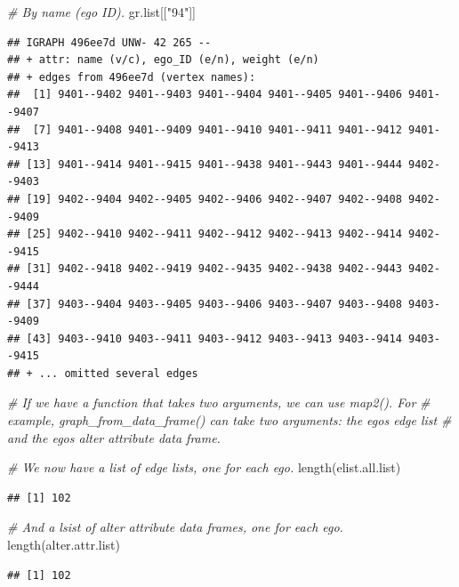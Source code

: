 \documentclass[
]{book}
\newenvironment{Shaded}{\begin{snugshade}}{\end{snugshade}}
\newcommand{\CommentTok}[1]{\textcolor[rgb]{0.56,0.35,0.01}{\textit{#1}}}
\newcommand{\FunctionTok}[1]{\textcolor[rgb]{0.00,0.00,0.00}{#1}}
\newcommand{\NormalTok}[1]{#1}
\newcommand{\StringTok}[1]{\textcolor[rgb]{0.31,0.60,0.02}{#1}}
\begin{document}
\begin{Shaded}
\begin{Highlighting}[]
\CommentTok{\# By name (ego ID).}
\NormalTok{gr.list[[}\StringTok{"94"}\NormalTok{]]}
\end{Highlighting}
\end{Shaded}

\begin{verbatim}
## IGRAPH 496ee7d UNW- 42 265 -- 
## + attr: name (v/c), ego_ID (e/n), weight (e/n)
## + edges from 496ee7d (vertex names):
##  [1] 9401--9402 9401--9403 9401--9404 9401--9405 9401--9406 9401--9407
##  [7] 9401--9408 9401--9409 9401--9410 9401--9411 9401--9412 9401--9413
## [13] 9401--9414 9401--9415 9401--9438 9401--9443 9401--9444 9402--9403
## [19] 9402--9404 9402--9405 9402--9406 9402--9407 9402--9408 9402--9409
## [25] 9402--9410 9402--9411 9402--9412 9402--9413 9402--9414 9402--9415
## [31] 9402--9418 9402--9419 9402--9435 9402--9438 9402--9443 9402--9444
## [37] 9403--9404 9403--9405 9403--9406 9403--9407 9403--9408 9403--9409
## [43] 9403--9410 9403--9411 9403--9412 9403--9413 9403--9414 9403--9415
## + ... omitted several edges
\end{verbatim}

\begin{Shaded}
\begin{Highlighting}[]
\CommentTok{\# If we have a function that takes two arguments, we can use map2(). For}
\CommentTok{\# example, graph\_from\_data\_frame() can take two arguments: the ego\textquotesingle{}s edge list}
\CommentTok{\# and the ego\textquotesingle{}s alter attribute data frame. }

\CommentTok{\# We now have a list of edge lists, one for each ego.}
\FunctionTok{length}\NormalTok{(elist.all.list)}
\end{Highlighting}
\end{Shaded}

\begin{verbatim}
## [1] 102
\end{verbatim}

\begin{Shaded}
\begin{Highlighting}[]
\CommentTok{\# And a lsist of alter attribute data frames, one for each ego.}
\FunctionTok{length}\NormalTok{(alter.attr.list)}
\end{Highlighting}
\end{Shaded}

\begin{verbatim}
## [1] 102
\end{verbatim}
\end{document}
